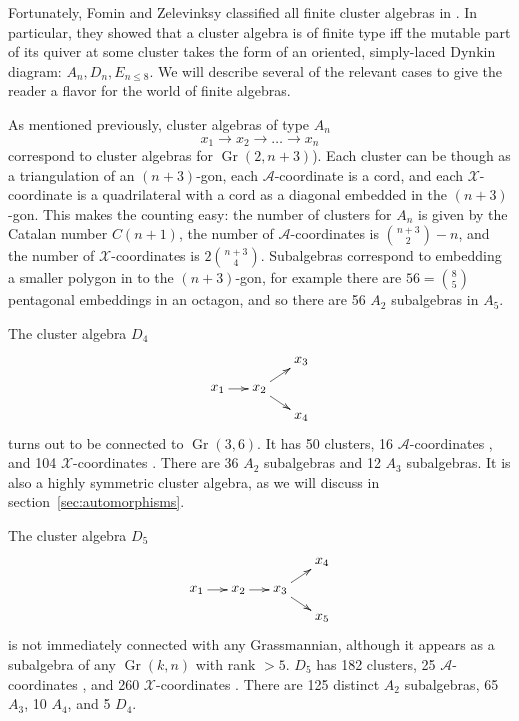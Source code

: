 \documentclass[11pt]{article}
\DeclareMathOperator{\Gr}{Gr}
\def\xcoord{$\mathcal{X}$-coordinate }
\def\xcoords{$\mathcal{X}$-coordinates }
\def\acoord{$\mathcal{A}$-coordinate }
\def\acoords{$\mathcal{A}$-coordinates }
\begin{document}
Fortunately, Fomin and Zelevinksy classified all finite cluster algebras in \cite{1054.17024}. In particular, they showed that a cluster algebra is of finite type iff the mutable part of its quiver at some cluster takes the form of an oriented, simply-laced Dynkin diagram: $A_n, D_n, E_{n\le8}$. We will describe several of the relevant cases to give the reader a flavor for the world of finite algebras. 

As mentioned previously, cluster algebras of type $A_n$
\begin{equation}\label{def:An}
  x_1\to x_2\to \ldots \to x_n
\end{equation}
correspond to cluster algebras for $\Gr(2,n{+}3)$). Each cluster can be though as a triangulation of an $(n+3)$-gon, each \acoord is a cord, and each \xcoord is a quadrilateral with a cord as a diagonal embedded in the $(n+3)$-gon. This makes the counting easy: the number of clusters for $A_n$ is given by the Catalan number $C(n+1)$, the number of \acoords is $\binom{n+3}{2}-n$, and the number of \xcoords is $2\binom{n+3}{4}$. Subalgebras correspond to embedding a smaller polygon in to the $(n+3)$-gon, for example there are $56=\binom{8}{5}$ pentagonal embeddings in an octagon, and so there are 56 $A_2$ subalgebras in $A_5$. 

The cluster algebra $D_4$
\begin{equation}\label{def:D4}
    \begin{gathered}
    \begin{xy} 0;<1pt,0pt>:<0pt,-1pt>::
      (0,20) *+{x_1} ="1",
      (30,20) *+{x_2} ="2",
      (60,0) *+{x_3} ="3",
      (60,40) *+{x_4} ="4",
      "1", {\ar"2"},
      "2", {\ar"3"},
      "2", {\ar"4"},
    \end{xy}
    \end{gathered}
\end{equation}
turns out to be connected to $\Gr(3,6)$. It has 50 clusters, 16 \acoords, and 104 \xcoords. There are 36 $A_2$ subalgebras and 12 $A_3$ subalgebras. It is also a highly symmetric cluster algebra, as we will discuss in section~\ref{sec:automorphisms}.

The cluster algebra $D_5$
\begin{equation}\label{def:D5}
    \begin{gathered}
    \begin{xy} 0;<1pt,0pt>:<0pt,-1pt>::
      (0,20) *+{x_1} ="1",
      (30,20) *+{x_2} ="2",
      (60,20) *+{x_3} ="3",
      (90,0) *+{x_4} ="4",
      (90,40) *+{x_5} ="5",
      "1", {\ar"2"},
      "2", {\ar"3"},
      "3", {\ar"4"},
      "3", {\ar"5"},
    \end{xy}
    \end{gathered}
\end{equation}
is not immediately connected with any Grassmannian, although it appears as a subalgebra of any $\Gr(k,n)$ with rank $> 5$. $D_5$ has 182 clusters, 25 \acoords, and 260 \xcoords. There are 125 distinct $A_2$ subalgebras, 65 $A_3$, 10 $A_4$, and 5 $D_4$. 
\end{document}
